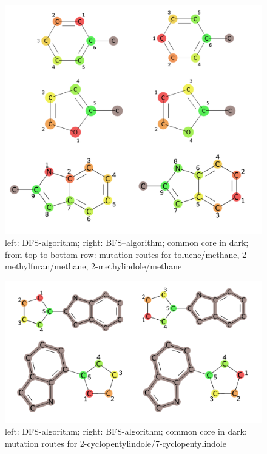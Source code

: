 \begin{figure}[!htb]
	
	\includegraphics[scale=0.75]{paper_routes1a}\caption{left: DFS-algorithm; right: BFS--algorithm; common core in dark; from top to bottom row: mutation routes for toluene/methane, 2-methylfuran/methane, 2-methylindole/methane}
	
\end{figure}


\begin{figure}[!htb]
	
	\includegraphics[scale=0.55]{paper_routes1b}\caption{left: DFS-algorithm; right: BFS-algorithm; common core in dark; mutation routes for 2-cyclopentylindole/7-cyclopentylindole}
	
\end{figure}


